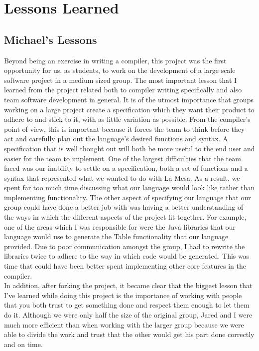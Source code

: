           
\chapter{Lessons Learned}

\section{Michael's Lessons}
Beyond being an exercise in writing a compiler, this project was the first opportunity 
for us, as students, to work on the development of a large scale software project in a 
medium sized group. The most important lesson that I learned from the project related 
both to compiler writing specifically and also team software development in general. 
It is of the utmost importance that groups working on a large project create a specification 
which they want their product to adhere to and stick to it, with as little variation as 
possible. From the compiler’s point of view, this is important because it forces the team 
to think before they act and carefully plan out the language’s desired functions and syntax. 
A specification that is well thought out will both be more useful to the end user and easier 
for the team to implement. One of the largest difficulties that the team faced was our 
inability to settle on a specification, both a set of functions and a syntax that represented 
what we wanted to do with La Mesa. As a result, we spent far too much time discussing 
what our language would look like rather than implementing functionality. The other aspect 
of specifying our language that our group could have done a better job with was having a 
better understanding of the ways in which the different aspects of the project fit together. 
For example, one of the areas which I was responsible for were the Java libraries that our 
language would use to generate the Table functionality that our language provided. Due to 
poor communication amongst the group, I had to rewrite the libraries twice to adhere to 
the way in which code would be generated. This was time that could have been better spent 
implementing other core features in the compiler. \\
In addition, after forking the project, it became clear that the biggest lesson that I've 
learned while doing this project is the importance of working with people that you both 
trust to get something done and respect them enough to let them do it. Although we were 
only half the size of the original group, Jared and I were much more efficient than when 
working with the larger group because we were able to divide the work and trust that the 
other would get his part done correctly and on time. 


